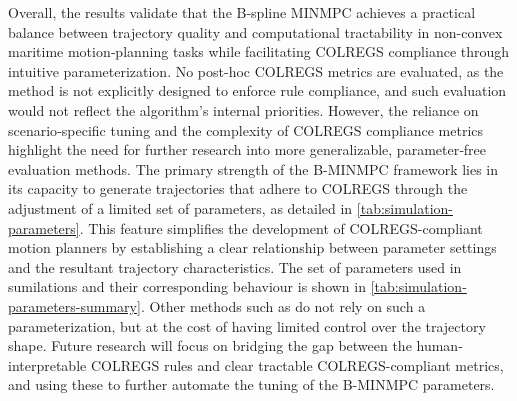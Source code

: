 Overall, the results validate that the B-spline MINMPC achieves a practical balance between trajectory quality and computational tractability in non-convex maritime motion‐planning tasks while facilitating COLREGS compliance through intuitive parameterization. 
No post-hoc COLREGS metrics are evaluated, as the method is not explicitly designed to enforce rule compliance, and such evaluation would not reflect the algorithm's internal priorities.
However, the reliance on scenario‐specific tuning and the complexity of COLREGS compliance metrics highlight the need for further research into more generalizable, parameter‐free evaluation methods. 
The primary strength of the B-MINMPC framework lies in its capacity to generate trajectories that adhere to COLREGS through the adjustment of a limited set of parameters, as detailed in \cref{tab:simulation-parameters}. This feature simplifies the development of COLREGS-compliant motion planners by establishing a clear relationship between parameter settings and the resultant trajectory characteristics. The set of parameters used in sumilations and their corresponding behaviour is shown in \cref{tab:simulation-parameters-summary}. Other methods such as \citet{Hagen2018,cho2021colreg,Menges2024} do not rely on such a parameterization, but at the cost of having limited control over the trajectory shape. 
Future research will focus on bridging the gap between the human-interpretable COLREGS rules and clear tractable COLREGS-compliant metrics, and using these to further automate the tuning of the B-MINMPC parameters.


